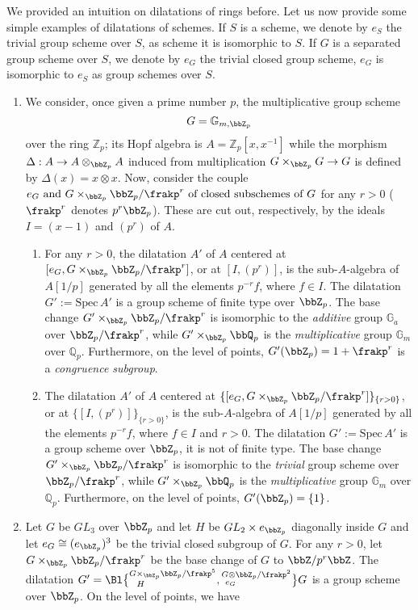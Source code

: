 \documentclass[10pt]{alggeom}
\theoremstyle{definition}
\numberwithin{equation}{section}
\begin{document}
We provided an intuition on dilatations of rings before. Let us now provide some simple examples of dilatations of schemes. If $S$ is a scheme, we denote by $e_S$ the trivial group scheme over $S$, as scheme it is isomorphic to $S$. If $G $ is a separated group scheme over $S$, we denote by $e_G$ the trivial closed group scheme, $e_G $ is isomorphic to $e_S$ as group schemes over $S$.
\begin{enumerate}
 \item  We consider, once given a prime number $p$, the  multiplicative  group scheme \[G= \mathbb G_{m,\bbZ _p}\] over the ring $\mathbb Z_p$; its Hopf algebra is $A=\mathbb Z_p[x,x^{-1}]$ while the morphism $\Delta:A\to A\otimes _{\bbZ _p} A$  induced from multiplication $G\times _ {\bbZ_p} G \to G$ is defined by
  $\Delta(x)= x\otimes x$. Now, consider the couple $ e_{G} \text{ and }  G \times _{\bbZ _p} \bbZ _p / \frakp^r \text{ of closed subschemes of } G $ for any $r >0$ ($\frakp^r$ denotes $p^r\bbZ _p$). These are cut out, respectively, by the ideals $I=(x-1)$ and $(p^r)$ of $A$.
\begin{enumerate} \item For any $r >0$, the dilatation $A'$ of $A$ centered at $[e_G ,  G \times _{\bbZ _p} \bbZ _p / \frakp^r]$, or at $[I,(p^r)]$,  is the sub-$A$-algebra of $A[1/p]$ generated by all the elements $p^{-r}f$, where $f\in I$.  The dilatation $G':=\mathrm {Spec}\, A'$ is a group scheme of finite type over $\bbZ_p$. The base change $G ' \times _{\bbZ _p} \bbZ _p / \frakp ^r$ is isomorphic to the {\it additive} group $\mathbb G_a$ over $ \bbZ_p /\frakp ^r$, while $G' \times _{\bbZ _p} \bbQ _p$ is the {\it multiplicative} group $\mathbb G_m$ over $\mathbb Q_p$. Furthermore, on the level of points, $G'(\bbZ_p)=1+\frakp^r$ is a {\it congruence subgroup}.
\item The dilatation $A'$ of $A$ centered at $\{ [e_G ,  G \times _{\bbZ _p} \bbZ _p / \frakp^r ] \} _{\{r > 0 \}}$,
 or at $\{[I,(p^r)]\}_{\{r >0\}}$,  is the sub-$A$-algebra of $A[1/p]$ generated by all the elements $p^{-r}f$, where $f\in I$ and $r > 0 $. 
 The dilatation $G':=\mathrm {Spec}\, A'$ is a group scheme over $\bbZ_p$, it is not of finite type. The base change $G ' \times _{\bbZ _p} \bbZ _p / \frakp ^r$ is isomorphic to the {\it trivial} group scheme over $ \bbZ_p /\frakp ^r$, while $G' \times _{\bbZ _p} \bbQ _p$ is the {\it multiplicative} group $\mathbb G_m$ over $\mathbb Q_p$. Furthermore, on the level of points, $G'(\bbZ_p)=\{1\}$.
 \end{enumerate}
 \item Let $G $ be $GL_3$ over $\bbZ _p $ and let $H $ be  $GL_2 \times e _{\bbZ _p} $ diagonally inside $G$ and let $e_G \cong (e_{\bbZ _p})^3$ be the trivial closed subgroup of $G$. For any $r>0$, let $G \times _{\bbZ _p}\bbZ _p/\frakp^r$ be the base change of $G$ to $\bbZ /p^r \bbZ$.
  The dilatation $G' =\Bl \big\{{}^{G \times _{\bbZ _p}  \bbZ _p /\frakp^5 }_{~~H} , {}^{G \otimes \bbZ _p /\frakp ^2 }_{~e_G} \big\} G$ 
  is a group scheme over $\bbZ _p$. On the level of points, we have 
  

\end{enumerate}
\end{document}
